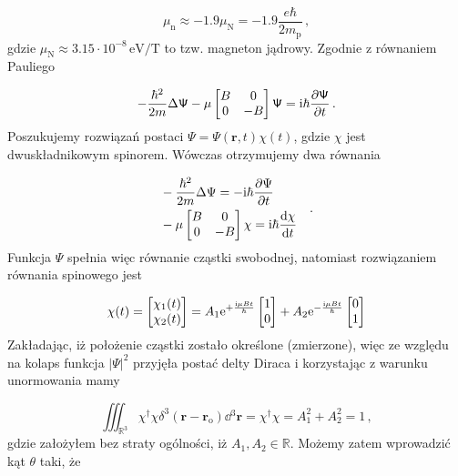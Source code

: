 \documentclass{myclass}
\begin{document}
\begin{equation*}
\mu_\text{n}\approx -1.9\mu_\text{N}=-1.9\frac{e\hbar}{2m_\text{p}}\,,
\end{equation*}
gdzie \(\mu_\text{N}\approx3.15\cdot10^{-8}\,\text{eV/T}\) to tzw. magneton jądrowy. Zgodnie z
równaniem Pauliego

\begin{equation*}
-\frac{\hbar^2}{2m}\Delta\mathsf{\Psi}-\mu\begin{bmatrix}
B & 0\\
0 & -B
\end{bmatrix}\mathsf{\Psi}=\mathrm{i}\hbar\pdv{\mathsf{\Psi}}{t}\,.
\end{equation*}
Poszukujemy rozwiązań postaci \(\mathsf{\Psi}=\Psi(\mathbf{r},t)\chi(t)\), gdzie \(\chi\) jest
dwuskładnikowym spinorem. Wówczas otrzymujemy dwa równania

\begin{equation*}
\begin{split}
&-\frac{\hbar^2}{2m}\Delta\Psi=-\mathrm{i}\hbar\pdv{\Psi}{t}\\
&-\mu\begin{bmatrix}
B & 0\\
0 & -B
\end{bmatrix}\chi=\mathrm{i}\hbar\dv{\chi}{t}
\end{split}\quad.
\end{equation*}
Funkcja \(\Psi\) spełnia więc równanie cząstki swobodnej, natomiast rozwiązaniem równania spinowego
jest

\begin{equation*}
\chi(t)=\begin{bmatrix}
\chi_1(t)\\
\chi_2(t)
\end{bmatrix}=
A_1\mathrm{e}^{+\frac{\mathrm{i}\mu Bt}{\hbar}}
\begin{bmatrix}
1\\0
\end{bmatrix}+A_2\mathrm{e}^{-\frac{\mathrm{i}\mu Bt}{\hbar}}
\begin{bmatrix}
0\\1
\end{bmatrix}
\end{equation*}
Zakładając, iż położenie cząstki zostało określone (zmierzone), więc ze względu na kolaps funkcja
\(|\Psi|^2\) przyjęła postać delty Diraca i korzystając z warunku unormowania mamy

\begin{equation*}
\iiint_{\mathbb{R}^3}\chi^\dag\chi\delta^3(\mathbf{r}-\mathbf{r}_\text{o})\dd{^3\mathbf{r}}=\chi^\dag\chi=A_1^2+A_2^2=1\,,
\end{equation*}
gdzie założyłem bez straty ogólności, iż \(A_1,A_2\in\mathbb{R}\). Możemy zatem wprowadzić kąt
\(\theta\) taki, że
\end{document}
